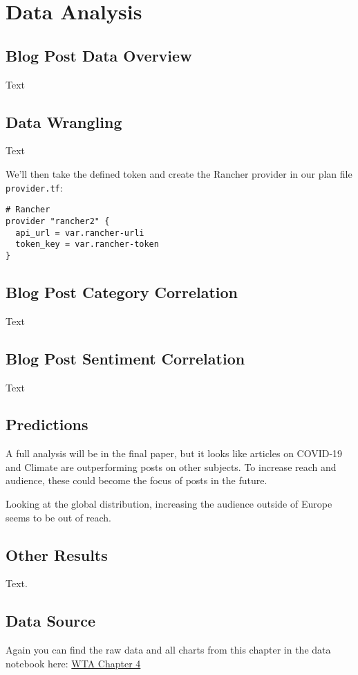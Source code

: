 %
%

\pagebreak
\section{Data Analysis}

\onehalfspacing

\subsection{Blog Post Data Overview}

Text

\subsection{Data Wrangling}

Text

We'll then take the defined token and create the Rancher provider in our plan file \verb|provider.tf|:

\begin{lstlisting}[caption=Rancher Provider, frame=single, basicstyle=\ttfamily]
# Rancher
provider "rancher2" {
  api_url = var.rancher-urli
  token_key = var.rancher-token
}
\end{lstlisting}

\subsection{Blog Post Category Correlation}

Text 

\subsection{Blog Post Sentiment Correlation}

Text

\subsection{Predictions}

A full analysis will be in the final paper, but it looks like articles on COVID-19 and Climate are outperforming posts on other subjects. To increase reach and audience, these could become the focus of posts in the future.

Looking at the global distribution, increasing the audience outside of Europe seems to be out of reach.

\subsection{Other Results}

Text.

\subsection{Data Source}

Again you can find the raw data and all charts from this chapter in the data notebook here: \href{https://plausible.io/chfrank.net}{WTA Chapter 4}
